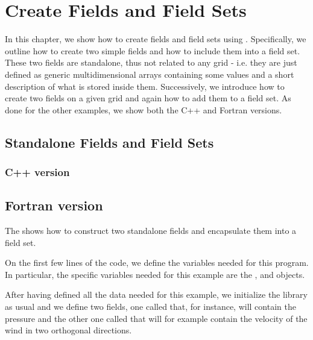 \chapter{Create Fields and Field Sets}
In this chapter, we show how to create fields and field sets
using \Atlas. Specifically, we outline how to create two simple 
fields and how to include them into a field set. These two fields
are standalone, thus not related to any grid - i.e. they are just 
defined as generic multidimensional arrays containing some values 
and a short description of what is stored inside them.
Successively, we introduce how to create two fields on a given 
grid and again how to add them to a field set.
As done for the other examples, we show both the C++ and Fortran 
versions.


\section{Standalone Fields and Field Sets}
\label{sect:standalone-fields}

\subsection{C++ version}

\section{Fortran version}
The  shows how to construct two standalone 
fields and encapsulate them into a field set. 
%

%
On the first few lines of the code, we define the variables
needed for this program. In particular, the \Atlas specific 
variables needed for this example are the , 
 and  objects.

After having defined all the data needed for this example, 
we initialize the \Atlas library as usual and we define 
two fields, one called  that, for 
instance, will contain the pressure and the other one 
called  that will for example contain 
the velocity of the wind in two orthogonal directions.

